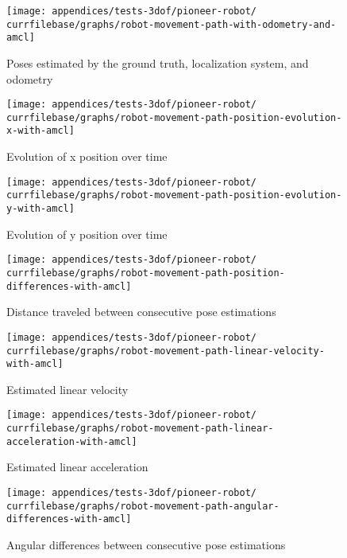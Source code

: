 \begin{figure}[H]
	\centering
	\texttt{[image: appendices/tests-3dof/pioneer-robot/\\currfilebase/graphs/robot-movement-path-with-odometry-and-amcl]}
	\caption{Poses estimated by the ground truth, localization system,  and odometry}
\end{figure}

\begin{figure}[H]
	\centering
	\texttt{[image: appendices/tests-3dof/pioneer-robot/\\currfilebase/graphs/robot-movement-path-position-evolution-x-with-amcl]}
	\caption{Evolution of x position over time}
\end{figure}

\begin{figure}[H]
	\centering
	\texttt{[image: appendices/tests-3dof/pioneer-robot/\\currfilebase/graphs/robot-movement-path-position-evolution-y-with-amcl]}
	\caption{Evolution of y position over time}
\end{figure}


\begin{figure}[H]
	\centering
	\texttt{[image: appendices/tests-3dof/pioneer-robot/\\currfilebase/graphs/robot-movement-path-position-differences-with-amcl]}
	\caption{Distance traveled between consecutive pose estimations}
\end{figure}

\begin{figure}[H]
	\centering
	\texttt{[image: appendices/tests-3dof/pioneer-robot/\\currfilebase/graphs/robot-movement-path-linear-velocity-with-amcl]}
	\caption{Estimated linear velocity}
\end{figure}

\begin{figure}[H]
	\centering
	\texttt{[image: appendices/tests-3dof/pioneer-robot/\\currfilebase/graphs/robot-movement-path-linear-acceleration-with-amcl]}
	\caption{Estimated linear acceleration}
\end{figure}


\begin{figure}[H]
	\centering
	\texttt{[image: appendices/tests-3dof/pioneer-robot/\\currfilebase/graphs/robot-movement-path-angular-differences-with-amcl]}
	\caption{Angular differences between consecutive pose estimations}
\end{figure}

